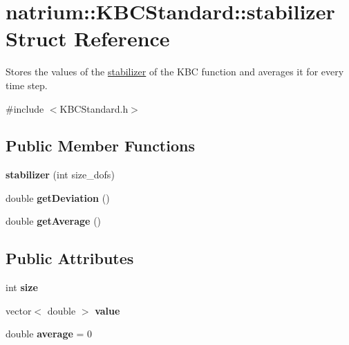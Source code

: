 \hypertarget{structnatrium_1_1KBCStandard_1_1stabilizer}{
\section{natrium::KBCStandard::stabilizer Struct Reference}
\label{structnatrium_1_1KBCStandard_1_1stabilizer}
}


Stores the values of the \hyperlink{structnatrium_1_1KBCStandard_1_1stabilizer}{stabilizer} of the KBC function and averages it for every time step.  


{\ttfamily \#include $<$KBCStandard.h$>$}\subsection*{Public Member Functions}
\begin{DoxyCompactItemize}
\item 
\hypertarget{structnatrium_1_1KBCStandard_1_1stabilizer_aaee41310e1065527dc70beaac313b4c7}{
{\bfseries stabilizer} (int size\_\-dofs)}
\label{structnatrium_1_1KBCStandard_1_1stabilizer_aaee41310e1065527dc70beaac313b4c7}

\item 
\hypertarget{structnatrium_1_1KBCStandard_1_1stabilizer_a8c8e8d5772d5a4adbd51625a160ed999}{
double {\bfseries getDeviation} ()}
\label{structnatrium_1_1KBCStandard_1_1stabilizer_a8c8e8d5772d5a4adbd51625a160ed999}

\item 
\hypertarget{structnatrium_1_1KBCStandard_1_1stabilizer_ac1512109458391a70d723a8e97299b23}{
double {\bfseries getAverage} ()}
\label{structnatrium_1_1KBCStandard_1_1stabilizer_ac1512109458391a70d723a8e97299b23}

\end{DoxyCompactItemize}
\subsection*{Public Attributes}
\begin{DoxyCompactItemize}
\item 
\hypertarget{structnatrium_1_1KBCStandard_1_1stabilizer_afab87dffa9fba5b04619c477f60dd623}{
int {\bfseries size}}
\label{structnatrium_1_1KBCStandard_1_1stabilizer_afab87dffa9fba5b04619c477f60dd623}

\item 
\hypertarget{structnatrium_1_1KBCStandard_1_1stabilizer_a4316b4c6ba3f8b7f2578632248a35ecd}{
vector$<$ double $>$ {\bfseries value}}
\label{structnatrium_1_1KBCStandard_1_1stabilizer_a4316b4c6ba3f8b7f2578632248a35ecd}

\item 
\hypertarget{structnatrium_1_1KBCStandard_1_1stabilizer_a2d757fae1c8c19f8706aca602c5a3259}{
double {\bfseries average} = 0}
\label{structnatrium_1_1KBCStandard_1_1stabilizer_a2d757fae1c8c19f8706aca602c5a3259}

\end{DoxyCompactItemize}


